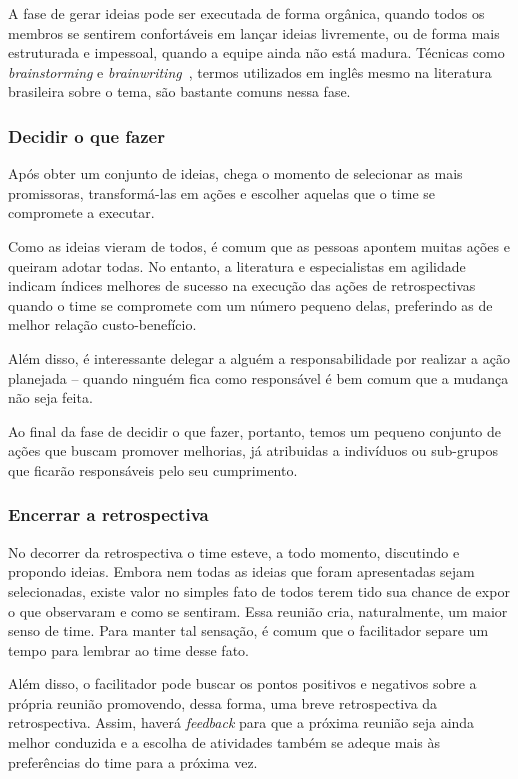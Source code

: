 A fase de gerar ideias pode ser executada de forma orgânica, quando todos os membros se sentirem confortáveis em lançar ideias livremente, ou de forma mais estruturada e impessoal, quando a equipe ainda não está madura. Técnicas como \textit{brainstorming} e \textit{brainwriting}~\cite{brainwriting}, termos utilizados em inglês mesmo na literatura brasileira sobre o tema, são bastante comuns nessa fase.

\subsubsection*{Decidir o que fazer}

Após obter um conjunto de ideias, chega o momento de selecionar as mais promissoras, transformá-las em ações e escolher aquelas que o time se compromete a executar.

Como as ideias vieram de todos, é comum que as pessoas apontem muitas ações e queiram adotar todas. No entanto, a literatura e especialistas em agilidade indicam índices melhores de sucesso na execução das ações de retrospectivas quando o time se compromete com um número pequeno delas, preferindo as de melhor relação custo-benefício.

Além disso, é interessante delegar a alguém a responsabilidade por realizar a ação planejada -- quando ninguém fica como responsável é bem comum que a mudança não seja feita.

Ao final da fase de decidir o que fazer, portanto, temos um pequeno conjunto de ações que buscam promover melhorias, já atribuidas a indivíduos ou sub-grupos que ficarão responsáveis pelo seu cumprimento.

\subsubsection*{Encerrar a retrospectiva}

No decorrer da retrospectiva o time esteve, a todo momento, discutindo e propondo ideias. Embora nem todas as ideias que foram apresentadas sejam selecionadas, existe valor no simples fato de todos terem tido sua chance de expor o que observaram e como se sentiram. Essa reunião cria, naturalmente, um maior senso de time. Para manter tal sensação, é comum que o facilitador separe um tempo para lembrar ao time desse fato.

Além disso, o facilitador pode buscar os pontos positivos e negativos sobre a própria reunião promovendo, dessa forma, uma breve retrospectiva da retrospectiva. Assim, haverá \textit{feedback} para que a próxima reunião seja ainda melhor conduzida e a escolha de atividades também se adeque mais às preferências do time para a próxima vez.

